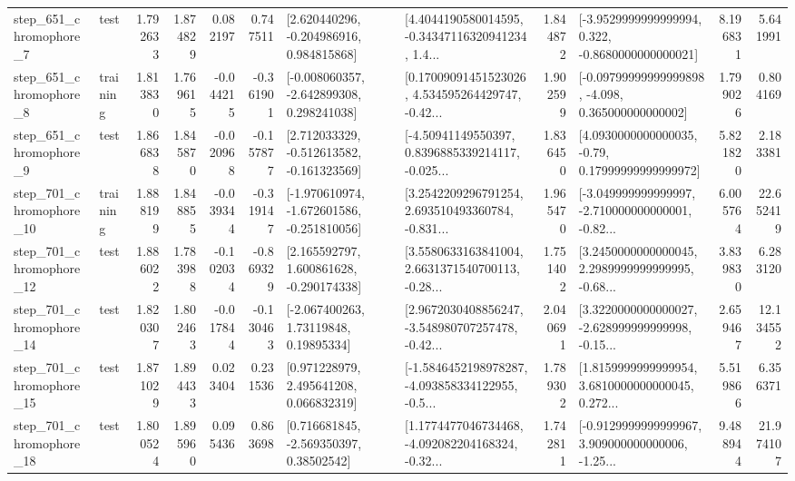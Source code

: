 \begin{tabular}{llrrrrllrlrr}
   step\_651\_chromophore\_7 &      test &      1.792633 &    1.874829 &      0.082197 &  0.747511 &    [2.620440296, -0.204986916, 0.984815868] &  [4.4044190580014595, -0.34347116320941234, 1.4... &       1.844872 &  [-3.9529999999999994, 0.322, -0.8680000000000021] &            8.196831 &          5.641991 \\
   step\_651\_chromophore\_8 &  training &      1.813830 &    1.769615 &     -0.044215 & -0.361901 &   [-0.008060357, -2.642899308, 0.298241038] &  [0.17009091451523026, 4.534595264429747, -0.42... &       1.902599 &  [-0.09799999999999898, -4.098, 0.365000000000002] &            1.799026 &          0.804169 \\
   step\_651\_chromophore\_9 &      test &      1.866838 &    1.845870 &     -0.020968 & -0.157877 &   [2.712033329, -0.512613582, -0.161323569] &  [-4.50941149550397, 0.8396885339214117, -0.025... &       1.836450 &   [4.0930000000000035, -0.79, 0.17999999999999972] &            5.821820 &          2.183381 \\
  step\_701\_chromophore\_10 &  training &      1.888199 &    1.848855 &     -0.039344 & -0.319147 &  [-1.970610974, -1.672601586, -0.251810056] &  [3.2542209296791254, 2.693510493360784, -0.831... &       1.965470 &  [-3.049999999999997, -2.710000000000001, -0.82... &            6.005764 &         22.652419 \\
  step\_701\_chromophore\_12 &      test &      1.886022 &    1.783988 &     -0.102034 & -0.869329 &    [2.165592797, 1.600861628, -0.290174338] &  [3.5580633163841004, 2.6631371540700113, -0.28... &       1.751402 &  [3.2450000000000045, 2.2989999999999995, -0.68... &            3.839830 &          6.283120 \\
  step\_701\_chromophore\_14 &      test &      1.820307 &    1.802463 &     -0.017844 & -0.130463 &      [-2.067400263, 1.73119848, 0.19895334] &  [2.9672030408856247, -3.548980707257478, -0.42... &       2.040691 &  [3.3220000000000027, -2.628999999999998, -0.15... &            2.659467 &         12.134552 \\
  step\_701\_chromophore\_15 &      test &      1.871029 &    1.894433 &      0.023404 &  0.231536 &     [0.971228979, 2.495641208, 0.066832319] &  [-1.5846452198978287, -4.093858334122955, -0.5... &       1.789302 &  [1.8159999999999954, 3.6810000000000045, 0.272... &            5.519866 &          6.356371 \\
  step\_701\_chromophore\_18 &      test &      1.800524 &    1.895960 &      0.095436 &  0.863698 &     [0.716681845, -2.569350397, 0.38502542] &  [1.1774477046734468, -4.092082204168324, -0.32... &       1.742811 &  [-0.9129999999999967, 3.909000000000006, -1.25... &            9.488944 &         21.974107 \\

\end{tabular}
